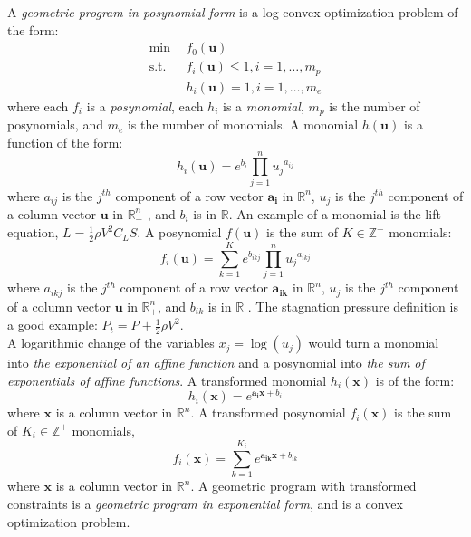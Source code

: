 A \emph{geometric program in posynomial form} is a log-convex optimization problem of the form:
\begin{equation}
    \label{GP_standard}
	\begin{split}
 \text{min} &~~f_0 \left(\mathbf{u}\right) \\
 \text{s.t.} &~~f_i \left(\mathbf{u}\right) \leq 1, i = 1,\ldots,m_p \\
 &~~h_i \left(\mathbf{u}\right) = 1, i = 1,\ldots,m_e
\end{split}
\end{equation}
where each $f_i$ is a {\em posynomial}, each $h_i$ is a {\em monomial}, $m_p$ is the number of posynomials,
and $m_e$ is the number of monomials. A monomial $h(\mathbf{u})$ is a function of the form:
\begin{equation}
	h_i(\mathbf{u}) = e^{b_i}\textstyle{\prod}_{j=1}^{n}{u_j}^{a_{ij}}
\end{equation}
where $a_{ij}$ is the $j^{th}$ component of a row vector $\mathbf{a_i}$ in $\mathbb{R}^n$,
$u_j$ is the $j^{th}$ component of a column vector $\mathbf{u}$ in $\mathbb{R}^n_+$ ,
and $b_i$ is in $\mathbb{R}$. An example of a monomial is the lift equation,
$L = \frac{1}{2}\rho V^2 C_L S$. A posynomial $f(\mathbf{u})$ is the sum of $K \in \mathbb{Z}^+$ monomials:
\begin{equation}
	f_i(\mathbf{u}) = \textstyle{\sum_{k=1}^{K}}e^{b_{ikj}}\prod_{j=1}^{n}{u_j}^{a_{ikj}}
\end{equation}
where $a_{ikj}$ is the $j^{th}$ component of a row vector $\mathbf{a_{ik}}$ in $\mathbb{R}^n$,
$u_j$ is the $j^{th}$ component of a column vector $\mathbf{u}$ in $\mathbb{R}^n_+$, and $b_{ik}$
is in $\mathbb{R}$ \cite{Boyd2007}. The stagnation pressure definition is a good example:
$P_t = P + \frac{1}{2} \rho V^2$.\\

A logarithmic change of the variables $x_j = \log(u_j)$ would turn a monomial into
{\em  the exponential of an affine function} and a posynomial into
{\em the sum of exponentials of affine functions}. A transformed monomial $h_i(\mathbf{x})$ is of the form:
\begin{equation}
    h_i(\mathbf{x}) = e^{\mathbf{a_i}\mathbf{x} + b_i}
\end{equation}
where $\mathbf{x}$ is a column vector in $\mathbb{R}^n$.
A transformed posynomial $f_i(\mathbf{x})$ is the sum of $K_i \in \mathbb{Z}^+$ monomials,
\begin{equation}
    f_i(\mathbf{x}) = \textstyle{\sum_{k=1}^{K_i}}e^{\mathbf{a_{ik}}\mathbf{x} + b_{ik}}
\end{equation}
where $\mathbf{x}$ is a column vector in $\mathbb{R}^n$.
A geometric program with transformed constraints is a \emph{geometric program in exponential form}, and
is a convex optimization problem.

